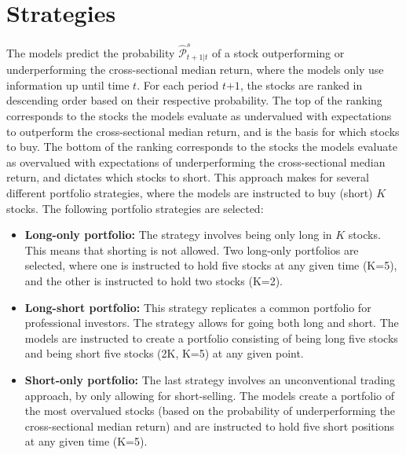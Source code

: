 \section{Strategies}
The models predict the probability $\widehat{\mathcal{P}}^{s}_{t+1|t}$ of a stock outperforming or underperforming the cross-sectional median return, where the models only use information up until time $\textit{t}$. For each period $\textit{t+1}$, the stocks are ranked in descending order based on their respective probability. The top of the ranking corresponds to the stocks the models evaluate as undervalued with expectations to outperform the cross-sectional median return, and is the basis for which stocks to buy. The bottom of the ranking corresponds to the stocks the models evaluate as overvalued with expectations of underperforming the cross-sectional median return, and dictates which stocks to short. This approach makes for several different portfolio strategies, where the models are instructed to buy (short) $\textit{K}$ stocks. The following portfolio strategies are selected:

\indent \newline
\begin{itemize}
\item {\textbf{Long-only portfolio:} The strategy involves being only long in $\textit{K}$ stocks. This means that shorting is not allowed. Two long-only portfolios are selected, where one is instructed to hold five stocks at any given time (K=5), and the other is instructed to hold two stocks (K=2).} 
\item {\textbf{Long-short portfolio:} This strategy replicates a common portfolio for professional investors. The strategy allows for going both long and short. The models are instructed to create a portfolio consisting of being long five stocks and being short five stocks (2K, K=5) at any given point.}
\item {\textbf{Short-only portfolio:} The last strategy involves an unconventional trading approach, by only allowing for short-selling. The models create a portfolio of the most overvalued stocks (based on the probability of underperforming the cross-sectional median return) and are instructed to hold five short positions at any given time (K=5).}
\end{itemize}  

